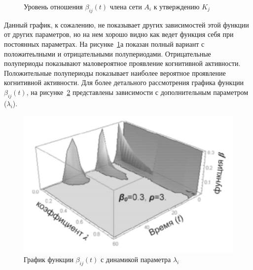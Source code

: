 \begin{figure}[h!]
\begin{minipage}[h]{0.4\linewidth}
    \end{minipage}
    \caption{Уровень отношения $\beta_{ij}(t)$ члена сети $A_{i}$ к утверждению $K_{j}$~\citep{pilkevich2015model}}
    \label{fig:graphic_beta}
\end{figure}

Данный график, к сожалению, не показывает других зависимостей этой функции от других параметров, но
на нем хорошо видно как ведет функция себя при постоянных параметрах.
На рисунке~\ref{fig:graphic_beta}а показан полный вариант с положитеьлными и отрицательными полупериодами.
Отрицательные полупериоды показывают маловероятное проявление когнитивной активности.
Положительные полупериоды показывает наиболее вероятное проявление когнитивной активности.
Для более детального рассмотрения графика функции $\beta_{ij}(t)$, на рисунке~\ref{fig:beta_another_param}
представлены зависимости с дополнительным параметром ($\lambda_{i}$).
\begin{figure}[h!]
    \centering
    \captionsetup{justification=centering}
    \includegraphics[width=0.7\linewidth]{pictures/graphic_beta_anotherparam.png}
    \caption{График функции $\beta_{ij}(t)$ с динамикой параметра $\lambda_{i}$~\citep{pilkevich2015model}}
    \label{fig:beta_another_param}
\end{figure}

